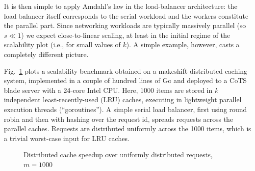 \documentclass[letterpaper,twocolumn,10pt]{article}
\begin{document}
It is then simple to apply Amdahl's law in the load-balancer architecture: the load balancer itself corresponds to the serial workload and the workers constitute the parallel part. Since networking workloads are typically massively parallel (so $s \ll 1$) we expect close-to-linear scaling, at least in the initial regime of the scalability plot (i.e., for small values of $k$). A simple example, however, casts a completely different picture.


Fig.~\ref{fig:multicore-cache} plots a scalability benchmark obtained on a makeshift distributed caching system, implemented in a couple of hundred lines of Go and deployed to a CoTS blade server with a 24-core Intel CPU. %
Here, 1000 items are stored in $k$ independent least-recently-used (LRU) caches, executing in lightweight parallel execution threads (``goroutines''). A simple serial load balancer, first using round robin and then with hashing over the request id, spreads requests across the parallel caches. Requests are distributed uniformly across the 1000 items, which is a trivial worst-case input for LRU caches.

\begin{figure}
  \centering
  
  \caption{Distributed cache speedup over uniformly distributed requests, $m=1000$}
  \label{fig:multicore-cache}
\end{figure}
\end{document}
